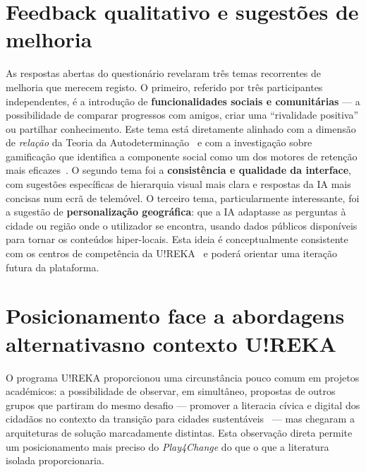 \section{Feedback qualitativo e sugestões de melhoria}
\label{sec:feedback-qualitativo}

As respostas abertas do questionário revelaram três temas recorrentes de melhoria que merecem registo. O primeiro, referido por três participantes independentes, é a introdução de \textbf{funcionalidades sociais e comunitárias} --- a possibilidade de comparar progressos com amigos, criar uma ``rivalidade positiva'' ou partilhar conhecimento. Este tema está diretamente alinhado com a dimensão de \emph{relação} da Teoria da Autodeterminação~\cite{deci1985intrinsic} e com a investigação sobre gamificação que identifica a componente social como um dos motores de retenção mais eficazes~\cite{ott2019gamification}. O segundo tema foi a \textbf{consistência e qualidade da interface}, com sugestões específicas de hierarquia visual mais clara e respostas da IA mais concisas num ecrã de telemóvel. O terceiro tema, particularmente interessante, foi a sugestão de \textbf{personalização geográfica}: que a IA adaptasse as perguntas à cidade ou região onde o utilizador se encontra, usando dados públicos disponíveis para tornar os conteúdos hiper-locais. Esta ideia é conceptualmente consistente com os centros de competência da U!REKA~\citep{ureka2026alliance} e poderá orientar uma iteração futura da plataforma.

\section[Posicionamento face a abordagens alternativas no contexto U!REKA]{Posicionamento face a abordagens alternativas\linebreak no contexto U!REKA}
\label{sec:posicionamento-ureka}

O programa U!REKA proporcionou uma circunstância pouco comum em projetos académicos: a possibilidade de observar, em simultâneo, propostas de outros grupos que partiram do mesmo desafio --- promover a literacia cívica e digital dos cidadãos no contexto da transição para cidades sustentáveis~\citep{ureka2026alliance} --- mas chegaram a arquiteturas de solução marcadamente distintas. Esta observação direta permite um posicionamento mais preciso do \emph{Play4Change} do que o que a literatura isolada proporcionaria.

